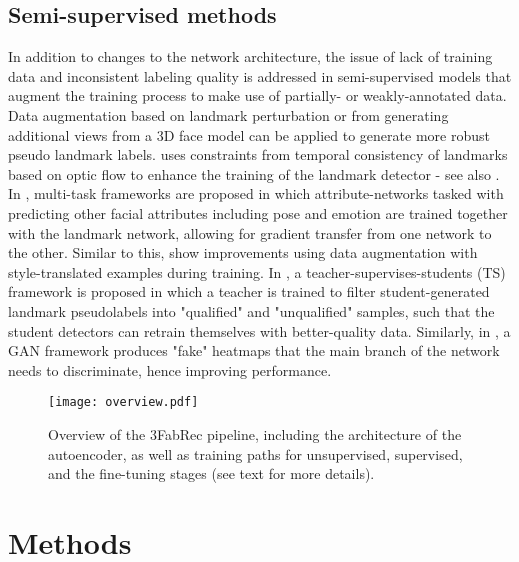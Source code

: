 \documentclass[10pt,twocolumn,letterpaper]{article}
\begin{document}
\subsection{Semi-supervised methods}
In addition to changes to the network architecture, the issue of lack of training data and inconsistent labeling quality is addressed in semi-supervised models \cite{kingma2014semi,zhu2017semi} that augment the training process to make use of partially- or weakly-annotated data. Data augmentation based on landmark perturbation \cite{lv2016landmark} or from generating additional views from a 3D face model \cite{Zhu2016} can be applied to generate more robust pseudo landmark labels. \cite{Dong2018} uses constraints from temporal consistency of landmarks based on optic flow to enhance the training of the landmark detector - see also \cite{Zakharov2019}. In \cite{Zhang2014,ranjan2017hyperface}, multi-task frameworks are proposed in which attribute-networks tasked with predicting other facial attributes including pose and emotion are trained together with the landmark network, allowing for gradient transfer from one network to the other. Similar to this, \cite{Qian2019} show improvements using data augmentation with style-translated examples during training. In \cite{Dong2019}, a teacher-supervises-students (TS) framework is proposed in which a teacher is trained to filter student-generated landmark pseudolabels into "qualified" and "unqualified" samples, such that the student detectors can retrain themselves with better-quality data. Similarly, in \cite{Robinson2019}, a GAN framework produces "fake" heatmaps that the main branch of the network needs to discriminate, hence improving performance.



\vspace{-0.0cm}

\begin{figure*}[h!]
	\begin{center}
		\texttt{[image: overview.pdf]}
	\end{center}
	\vspace{-0.8cm}
	\caption{\small Overview of the 3FabRec pipeline, including the architecture of the autoencoder, as well as training paths for unsupervised, supervised, and the fine-tuning stages (see text for more details).}
	\label{fig:overview}
	\vspace{-0.3cm}
\end{figure*}

\section{Methods}\label{sec:methods}\vspace{-0.0cm}
\end{document}
